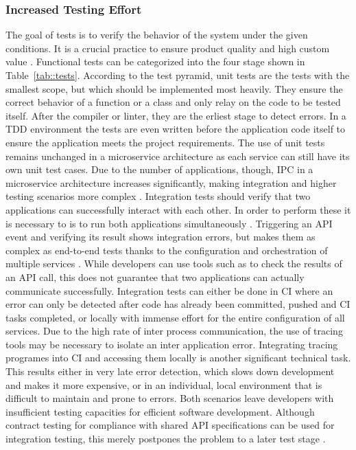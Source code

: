        \subsubsection{Increased Testing Effort}\label{sss::testing_problem}
        The goal of tests is to verify the behavior of the system under the given conditions. It is a crucial practice to ensure product quality and high custom value \cite{azuredevops}. Functional tests can be categorized into the four stage shown in Table~\ref{tab::tests}. According to the test pyramid, unit tests are the tests with the smallest scope, but which should be implemented most heavily. They ensure the correct behavior of a function or a class and only relay on the code to be tested itself. After the compiler or linter, they are the erliest stage to detect errors. In a \ac{TDD} environment the tests are even written before the application code itself to ensure the application meets the project requirements. The use of unit tests remains unchanged in a microservice architecture as each service can still have its own unit test cases. Due to the number of applications, though, \ac{IPC} in a microservice architecture increases significantly, making integration and higher testing scenarios more complex \cite{microtest}. \newline
        Integration tests should verify that two applications can successfully interact with each other. In order to perform these it is necessary to is to run both applications simultaneously \cite{azuredevops}. Triggering an \ac{API} event and verifying its result shows integration errors, but makes them as complex as end-to-end tests thanks to the configuration and orchestration of multiple services \cite{microtest}. While developers can use tools such as  to check the results of an \ac{API} call, this does not guarantee that two applications can actually communicate successfully. Integration tests can either be done in \ac{CI} where an error can only be detected after code has already been committed, pushed and \ac{CI} tasks completed, or locally with immense effort for the entire configuration of all services. Due to the high rate of inter process communication, the use of tracing tools may be necessary to isolate an inter application error. Integrating tracing programes into \ac{CI} and accessing them locally is another significant technical task. This results either in very late error detection, which slows down development and makes it more expensive, or in an individual, local environment that is difficult to maintain and prone to errors. Both scenarios leave developers with insufficient testing capacities for efficient software development. Although contract testing for compliance with shared \ac{API} specifications can be used for integration testing, this merely postpones the problem to a later test stage \cite{microtest}.\newline
